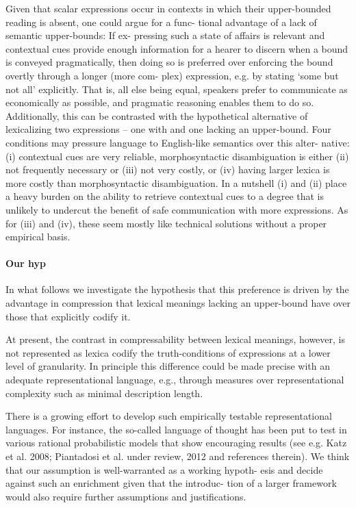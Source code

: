 \documentclass[a4paper]{article}
\newcommand{\hl}[1]{\textcolor[rgb]{.8,.33,.0}{#1}}%
\begin{document}
\hl{Given that scalar expressions occur in contexts in which their
upper-bounded reading is absent, one could argue for a func-
tional advantage of a lack of semantic upper-bounds:  If ex-
pressing such a state of affairs is relevant and contextual cues
provide enough information for a hearer to discern when a
bound is conveyed pragmatically, then doing so is preferred
over enforcing the bound overtly through a longer (more com-
plex) expression, e.g. by stating ‘some but not all’ explicitly.
That is, all else being equal, speakers prefer to communicate
as economically as possible, and pragmatic reasoning enables
them to do so.  Additionally, this can be contrasted with the
hypothetical alternative of lexicalizing two expressions – one
with and one lacking an upper-bound.  Four conditions may
pressure language to English-like semantics over this alter-
native: (i) contextual cues are very reliable, morphosyntactic
disambiguation is either (ii) not frequently necessary or (iii)
not  very  costly,  or  (iv)  having  larger  lexica  is  more  costly
than morphosyntactic disambiguation.   In a nutshell (i) and
(ii) place a heavy burden on the ability to retrieve contextual
cues to a degree that is unlikely to undercut the benefit of safe
communication with more expressions.  As for (iii) and (iv),
these seem mostly like technical solutions without a proper
empirical basis.}



\paragraph{Our hyp}
In what follows we investigate the hypothesis that this preference is driven by the advantage in compression that lexical meanings lacking an upper-bound have over those that explicitly codify it.

At present, the contrast in compressability between lexical meanings, however, is not represented as lexica codify the truth-conditions of expressions at a lower level of granularity. In principle this difference could be made precise with an adequate representational language, e.g., through measures over representational complexity such as minimal description length. 

There is a growing effort to develop such
empirically  testable  representational  languages.   For  instance,  the
so-called
language of thought
has been put to test in various rational
probabilistic models that show encouraging results (see e.g. Katz et
al. 2008; Piantadosi et al. under review, 2012 and references therein).
We think that our assumption is well-warranted as a working hypoth-
esis and decide against such an enrichment given that the introduc-
tion of a larger framework would also require further assumptions
and justifications.
\end{document}
